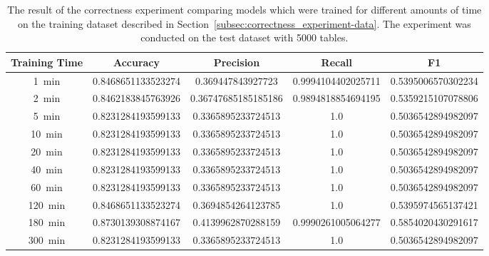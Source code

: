 \begin{table}[ht]
  \centering
  \caption[Result for Correctness: Comparing different training times]{The result of the correctness experiment comparing models which were trained for different amounts of time on the training dataset described in Section~\ref{subsec:correctness_experiment-data}. The experiment was conducted on the test dataset with \num{5000} tables.} %
  \begin{tabular}{SSSSS}
    \toprule
    {Training Time}   & {Accuracy}         & {Precision}         & {Recall}           & {F1}               \\ \midrule
    \SI{1}{\minute}   & 0.8468651133523274 & 0.369447843927723   & 0.9994104402025711 & 0.5395006570302234 \\
    \SI{2}{\minute}   & 0.8462183845763926 & 0.36747685185185186 & 0.9894818854694195 & 0.5359215107078806 \\
    \SI{5}{\minute}   & 0.8231284193599133 & 0.3365895233724513  & 1.0                & 0.5036542894982097 \\
    \SI{10}{\minute}  & 0.8231284193599133 & 0.3365895233724513  & 1.0                & 0.5036542894982097 \\
    \SI{20}{\minute}  & 0.8231284193599133 & 0.3365895233724513  & 1.0                & 0.5036542894982097 \\
    \SI{40}{\minute}  & 0.8231284193599133 & 0.3365895233724513  & 1.0                & 0.5036542894982097 \\
    \SI{60}{\minute}  & 0.8231284193599133 & 0.3365895233724513  & 1.0                & 0.5036542894982097 \\
    \SI{120}{\minute} & 0.8468651133523274 & 0.3694854264123785  & 1.0                & 0.5395974565137421 \\
    \SI{180}{\minute} & 0.8730139308874167 & 0.4139962870288159  & 0.9990261005064277 & 0.5854020430291617 \\
    \SI{300}{\minute} & 0.8231284193599133 & 0.3365895233724513  & 1.0                & 0.5036542894982097 \\
    \bottomrule
  \end{tabular}\label{table:correctness-compare_training_time}
\end{table}